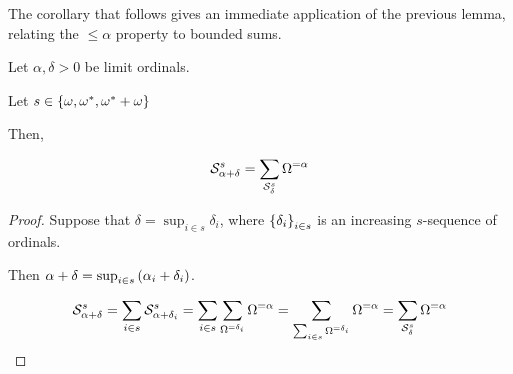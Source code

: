 The corollary that follows gives an immediate application of the previous lemma, relating the $\le \alpha$ property to
bounded sums.

\begin{corollary}
  Let $\alpha, \delta > 0$ be limit ordinals.

  Let $s \in \left\{ {\omega, \omega^\ast, \omega^\ast + \omega} \right\}$

  Then,

  \[
    \mathcal{S}^{s}_{\alpha + \delta}
    = \sum_{\mathcal{S}^{s}_{\delta}}{\Omega^{= \alpha}}
  \]
\end{corollary}

\begin{proof}
  Suppose that $\delta = \sup_{i \in s} \delta_i$,
  where $\left\{ {\delta_i} \right\}_{i \in s}$ is an increasing $s$-sequence
  of ordinals.

  Then $\alpha + \delta = \sup_{i \in s} \left( {\alpha_i + \delta_i} \right)$.

  \[
    \mathcal{S}^{s}_{\alpha + \delta}
    = \sum_{i \in s}{\mathcal{S}^{s}_{\alpha + \delta_i}}
    = \sum_{i \in s}\sum_{\Omega^{= \delta_i}}{\Omega^{= \alpha}}
    = \sum_{\sum_{i \in s}{\Omega^{= \delta_i}}}{\Omega^{= \alpha}}
    = \sum_{\mathcal{S}^{s}_{\delta}}{\Omega^{= \alpha}}
  \]
\end{proof}
